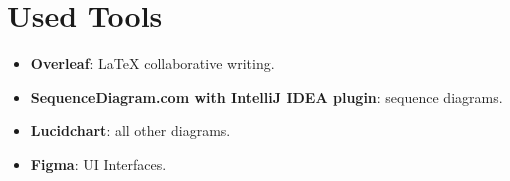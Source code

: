 \section{Used Tools}
\label{sec:used_tools}

\begin{itemize}
    \item \textbf{Overleaf}: LaTeX collaborative writing.
    \item \textbf{SequenceDiagram.com with IntelliJ IDEA plugin}: sequence diagrams.
    \item \textbf{Lucidchart}: all other diagrams.
    \item \textbf{Figma}: UI Interfaces.
\end{itemize}
